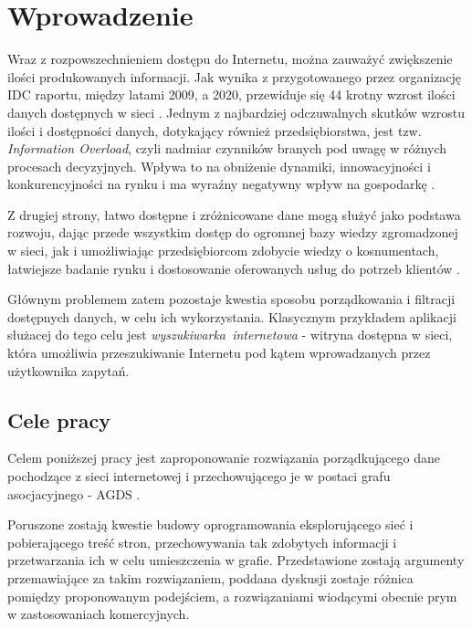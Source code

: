 \chapter{Wprowadzenie}
\label{cha:wprowadzenie}

Wraz z rozpowszechnieniem dostępu do Internetu, można zauważyć zwiększenie ilości produkowanych informacji. Jak wynika z przygotowanego przez organizację IDC raportu, między latami 2009, a 2020, przewiduje się 44 krotny wzrost ilości danych dostępnych w sieci \cite{DigUni}. Jednym z najbardziej odczuwalnych skutków wzrostu ilości i dostępności danych, dotykający również przedsiębiorstwa, jest tzw. \emph{Information Overload}, czyli nadmiar czynników branych pod uwagę  w różnych procesach decyzyjnych. Wpływa to na obniżenie dynamiki, innowacyjności i konkurencyjności na rynku i ma wyraźny negatywny wpływ na gospodarkę \cite{InfOver}.

Z drugiej strony, łatwo dostępne i zróżnicowane dane mogą służyć jako podstawa rozwoju, dając przede wszystkim dostęp do ogromnej bazy wiedzy zgromadzonej w sieci, jak i umożliwiając przedsiębiorcom zdobycie wiedzy o kosnumentach, łatwiejsze badanie rynku i dostosowanie oferowanych usług do potrzeb klientów \cite[s. 1-26]{DMining}.

Głównym problemem zatem pozostaje kwestia sposobu porządkowania i filtracji dostępnych danych, w celu ich wykorzystania. Klasycznym przykładem aplikacji służacej do tego celu jest \emph{wyszukiwarka~internetowa} - witryna dostępna w sieci, która umożliwia przeszukiwanie Internetu pod kątem wprowadzanych przez użytkownika zapytań.


\section{Cele pracy}
\label{sec:celePracy}

Celem poniższej pracy jest zaproponowanie rozwiązania porządkującego dane pochodzące z sieci internetowej i przechowującego je w postaci grafu asocjacyjnego - AGDS \cite[s. 112-117]{Horzyk}.

Poruszone zostają kwestie budowy oprogramowania eksplorującego sieć i pobierającego treść stron, przechowywania tak zdobytych informacji i przetwarzania ich w celu umieszczenia w grafie. Przedstawione zostają argumenty przemawiające za takim rozwiązaniem, poddana dyskusji zostaje różnica pomiędzy proponowanym podejściem, a rozwiązaniami wiodącymi obecnie prym w zastosowaniach komercyjnych.
%

